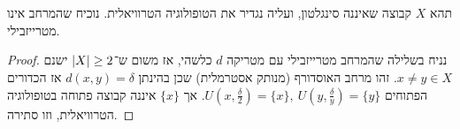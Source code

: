 \documentclass[]{../../../../../tex/classes/homework}
\begin{document}
	\section{}
	תהא $X$ קבוצה שאיננה סינגלטון, ועליה נגדיר את הטופולוגיה הטרוויאלית. נוכיח שהמרחב אינו מטרייזבילי. \begin{proof}
		נניח בשלילה שהמרחב מטרייזבילי עם מטריקה $d$ כלשהי, אז משום ש־$\left \lvert X \right \rvert \ge 2$ ישנם $x \neq y \in X$. זהו מרחב האוסדורף (מנותק אסטרמלית) שכן בהינתן $d(x, y) = \delta$ אז הכדורים הפתוחים $U(x, \frac{\delta}{2}) = \{x\}, \ U(y, \frac{\delta}{y}) = \{y\}$. אך $\{x\}$ איננה קבוצה פתוחה בטופולוגיה הטרוויאלית, וזו סתירה. 
	\end{proof}
	
	
	\ndoc
	
	
	
	
\end{document}
